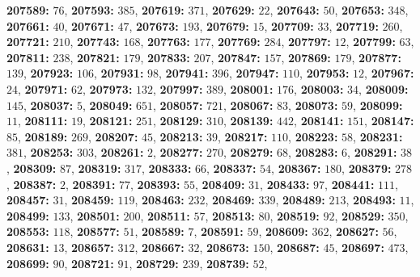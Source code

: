 \textsf{\bfseries 207589:} $76$, \textsf{\bfseries 207593:} $385$, \textsf{\bfseries 207619:} $371$, \textsf{\bfseries 207629:} $22$, \textsf{\bfseries 207643:} $50$, \textsf{\bfseries 207653:} $348$, \textsf{\bfseries 207661:} $40$, \textsf{\bfseries 207671:} $47$, \textsf{\bfseries 207673:} $193$, \textsf{\bfseries 207679:} $15$, \textsf{\bfseries 207709:} $33$, \textsf{\bfseries 207719:} $260$, \textsf{\bfseries 207721:} $210$, \textsf{\bfseries 207743:} $168$, \textsf{\bfseries 207763:} $177$, \textsf{\bfseries 207769:} $284$, \textsf{\bfseries 207797:} $12$, \textsf{\bfseries 207799:} $63$, \textsf{\bfseries 207811:} $238$, \textsf{\bfseries 207821:} $179$, \textsf{\bfseries 207833:} $207$, \textsf{\bfseries 207847:} $157$, \textsf{\bfseries 207869:} $179$, \textsf{\bfseries 207877:} $139$, \textsf{\bfseries 207923:} $106$, \textsf{\bfseries 207931:} $98$, \textsf{\bfseries 207941:} $396$, \textsf{\bfseries 207947:} $110$, \textsf{\bfseries 207953:} $12$, \textsf{\bfseries 207967:} $24$, \textsf{\bfseries 207971:} $62$, \textsf{\bfseries 207973:} $132$, \textsf{\bfseries 207997:} $389$, \textsf{\bfseries 208001:} $176$, \textsf{\bfseries 208003:} $34$, \textsf{\bfseries 208009:} $145$, \textsf{\bfseries 208037:} $5$, \textsf{\bfseries 208049:} $651$, \textsf{\bfseries 208057:} $721$, \textsf{\bfseries 208067:} $83$, \textsf{\bfseries 208073:} $59$, \textsf{\bfseries 208099:} $11$, \textsf{\bfseries 208111:} $19$, \textsf{\bfseries 208121:} $251$, \textsf{\bfseries 208129:} $310$, \textsf{\bfseries 208139:} $442$, \textsf{\bfseries 208141:} $151$, \textsf{\bfseries 208147:} $85$, \textsf{\bfseries 208189:} $269$, \textsf{\bfseries 208207:} $45$, \textsf{\bfseries 208213:} $39$, \textsf{\bfseries 208217:} $110$, \textsf{\bfseries 208223:} $58$, \textsf{\bfseries 208231:} $381$, \textsf{\bfseries 208253:} $303$, \textsf{\bfseries 208261:} $2$, \textsf{\bfseries 208277:} $270$, \textsf{\bfseries 208279:} $68$, \textsf{\bfseries 208283:} $6$, \textsf{\bfseries 208291:} $38$, \textsf{\bfseries 208309:} $87$, \textsf{\bfseries 208319:} $317$, \textsf{\bfseries 208333:} $66$, \textsf{\bfseries 208337:} $54$, \textsf{\bfseries 208367:} $180$, \textsf{\bfseries 208379:} $278$, \textsf{\bfseries 208387:} $2$, \textsf{\bfseries 208391:} $77$, \textsf{\bfseries 208393:} $55$, \textsf{\bfseries 208409:} $31$, \textsf{\bfseries 208433:} $97$, \textsf{\bfseries 208441:} $111$, \textsf{\bfseries 208457:} $31$, \textsf{\bfseries 208459:} $119$, \textsf{\bfseries 208463:} $232$, \textsf{\bfseries 208469:} $339$, \textsf{\bfseries 208489:} $213$, \textsf{\bfseries 208493:} $11$, \textsf{\bfseries 208499:} $133$, \textsf{\bfseries 208501:} $200$, \textsf{\bfseries 208511:} $57$, \textsf{\bfseries 208513:} $80$, \textsf{\bfseries 208519:} $92$, \textsf{\bfseries 208529:} $350$, \textsf{\bfseries 208553:} $118$, \textsf{\bfseries 208577:} $51$, \textsf{\bfseries 208589:} $7$, \textsf{\bfseries 208591:} $59$, \textsf{\bfseries 208609:} $362$, \textsf{\bfseries 208627:} $56$, \textsf{\bfseries 208631:} $13$, \textsf{\bfseries 208657:} $312$, \textsf{\bfseries 208667:} $32$, \textsf{\bfseries 208673:} $150$, \textsf{\bfseries 208687:} $45$, \textsf{\bfseries 208697:} $473$, \textsf{\bfseries 208699:} $90$, \textsf{\bfseries 208721:} $91$, \textsf{\bfseries 208729:} $239$, \textsf{\bfseries 208739:} $52$, 
